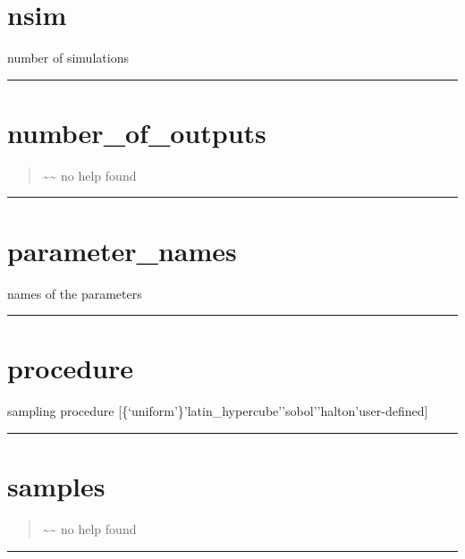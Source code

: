 \documentclass[letterpaper,10pt,english]{sphinxmanual}
\begin{document}
\section{nsim}
\label{classes/utils/@mcf/mcf:id26}\label{classes/utils/@mcf/mcf:nsim}
number of simulations


\bigskip\hrule{}\bigskip



\section{number\_of\_outputs}
\label{classes/utils/@mcf/mcf:id27}\label{classes/utils/@mcf/mcf:number-of-outputs}\begin{quote}

\textasciitilde{}\textasciitilde{} no help found
\end{quote}


\bigskip\hrule{}\bigskip



\section{parameter\_names}
\label{classes/utils/@mcf/mcf:parameter-names}\label{classes/utils/@mcf/mcf:id28}
names of the parameters


\bigskip\hrule{}\bigskip



\section{procedure}
\label{classes/utils/@mcf/mcf:id29}\label{classes/utils/@mcf/mcf:procedure}
sampling procedure {[}\{`uniform'\}\textbar{}'latin\_hypercube'\textbar{}'sobol'\textbar{}'halton'{\color{red}\bfseries{}\textbar{}}user-defined{]}


\bigskip\hrule{}\bigskip



\section{samples}
\label{classes/utils/@mcf/mcf:id32}\label{classes/utils/@mcf/mcf:samples}\begin{quote}

\textasciitilde{}\textasciitilde{} no help found
\end{quote}


\bigskip\hrule{}\bigskip
\end{document}

